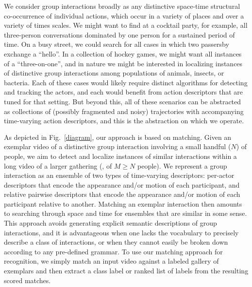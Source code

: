 We consider group interactions broadly as any distinctive space-time structural co-occurrence of individual actions, which occur in a variety of places and over a variety of times scales. We might want to find at a cocktail party, for example, all three-person conversations dominated by one person for a sustained period of time. On a busy street, we could search for all cases in which two passersby exchange a ``hello''. In a collection of hockey games, we might want all instances of a ``three-on-one'', and in nature we might be interested in localizing instances of distinctive group interactions among populations of animals, insects, or bacteria. Each of these cases would likely require distinct algorithms for detecting and tracking the actors, and each would benefit from action descriptors that are tuned for that setting. But beyond this, all of these scenarios can be abstracted as collections of (possibly fragmented and noisy) trajectories with accompanying time-varying action descriptors, and this is the abstraction on which we operate.
 
As depicted in Fig.~\ref{diagram}, our approach is based on matching. Given an exemplar video of a distinctive group interaction involving a small handful ($N$) of people, we aim to detect and localize instances of similar interactions within a long video of a larger gathering (\ie, of $M\ge N$ people). We represent a group interaction as an ensemble of two types of time-varying descriptors: per-actor descriptors that encode the appearance and/or motion of each participant, and relative pairwise descriptors that encode the appearance and/or motion of each participant relative to another. Matching an exemplar interaction then amounts to searching through space and time for ensembles that are similar in some sense. This approach avoids generating explicit semantic descriptions of group interactions, and it is advantageous when one lacks the vocabulary to precisely describe a class of interactions, or when they cannot easily be broken down according to any pre-defined grammar. To use our matching approach for recognition, we simply match an input video against a labeled gallery of exemplars and then extract a class label or ranked list of labels from the resulting scored matches.

